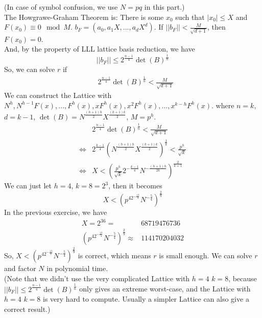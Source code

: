 \documentclass[
12pt, %
]{fphw}
\begin{document}
(In case of symbol confusion, we use $N=pq$ in this part.)\\
The Howgrawe-Graham Theorem is: There is some $x_0$ such that $|x_0|\leq X$ and$F(x_0)\equiv0 \mod M$. $b_F=(a_0,a_1X,...,a_dX^d)$. If $||b_F||<\frac{M}{\sqrt{d+1}}$, then $F(x_0)=0$.\\
And, by the property of LLL lattice basis reduction, we have
\[||b_F||\leq2^{\frac{n-1}{4}}\det(B)^\frac{1}{n}\]
So, we can solve $r$ if
\begin{align*}
	&2^{\frac{n-1}{4}}\det(B)^\frac{1}{n}<\frac{M}{\sqrt{d+1}}
\end{align*}
We can construct the Lattice with $N^h,N^{h-1}F(x),...,F^h(x),xF^h(x),x^2F^h(x),...,x^{k-h}F^h(x)$.
where $n=k$, $d=k-1$, $\det(B)=N^{\frac{(h+1)h}{2}}X^\frac{(k+1)k}{2}$, $M=p^h$.
\begin{align*}
	&2^{\frac{n-1}{4}}\det(B)^\frac{1}{n}<\frac{M}{\sqrt{d+1}}\\
	\Leftrightarrow&2^{\frac{k-1}{4}}(N^{\frac{(h+1)h}{2}}X^\frac{(k+1)k}{2})^\frac{1}{k}<\frac{p^h}{\sqrt{k}}\\
	\Leftrightarrow&X<(\frac{p^h}{\sqrt{k}}2^{-\frac{k-1}{4}}N^{-\frac{(h+1)h}{2k}})^\frac{2}{k+1}
\end{align*}
We can just let $h=4$, $k=8=2^3$, then it becomes
\[X<(p^42^{-\frac{13}{4}}N^{-\frac{5}{4}})^\frac{2}{9}\]
In the previous exercise, we have
\begin{align*}
	X=2^{36}=&68719476736\\
	(p^42^{-\frac{13}{4}}N^{-\frac{5}{4}})^\frac{2}{9}\approx&114170204032
\end{align*}
So, $X<(p^42^{-\frac{13}{4}}N^{-\frac{5}{4}})^\frac{2}{9}$ is correct, which means $r$ is small enough. We can solve $r$ and factor $N$ in polynomial time. \\
(Note that we didn't use the very complicated Lattice with $h=4$ $k=8$, because $||b_F||\leq2^{\frac{n-1}{4}}\det(B)^\frac{1}{n}$ only gives an extreme worst-case, and the  Lattice with $h=4$ $k=8$ is very hard to compute. Usually a simpler Lattice can also give a correct result.)
\end{document}
